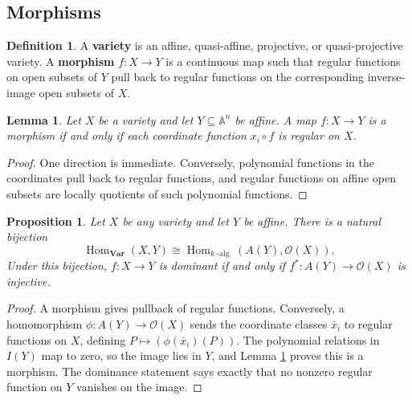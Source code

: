\documentclass[12pt]{article}
\theoremstyle{plain}
\newtheorem{proposition}[thm]{Proposition}
\newtheorem{lemma}[thm]{Lemma}
\theoremstyle{definition}
\newtheorem{defn}[thm]{Definition} %
\newcommand{\bb}[1]{\mathbb{#1}}
\DeclareMathOperator{\Hom}{Hom}
\begin{document}
\subsection{Morphisms}
\begin{defn}
A \textbf{variety} is an affine, quasi-affine, projective, or quasi-projective variety. A \textbf{morphism} $f:X\to Y$ is a continuous map such that regular functions on open subsets of $Y$ pull back to regular functions on the corresponding inverse-image open subsets of $X$.
\end{defn}
\begin{lemma}\label{lem:check_variables}
Let $X$ be a variety and let $Y\subseteq\bb A^n$ be affine. A map $f:X\to Y$ is a morphism if and only if each coordinate function $x_i\circ f$ is regular on $X$.
\end{lemma}
\begin{proof}
One direction is immediate. Conversely, polynomial functions in the coordinates pull back to regular functions, and regular functions on affine open subsets are locally quotients of such polynomial functions.
\end{proof}
\begin{proposition}\label{prop:adjunction}
Let $X$ be any variety and let $Y$ be affine. There is a natural bijection
\[
\Hom_{\mathbf{Var}}(X,Y)\cong\Hom_{k\operatorname{-alg}}(A(Y),\mathcal O(X)).
\]
Under this bijection, $f:X\to Y$ is dominant if and only if $f^*:A(Y)\to\mathcal O(X)$ is injective.
\end{proposition}
\begin{proof}
A morphism gives pullback of regular functions. Conversely, a homomorphism $\phi:A(Y)\to\mathcal O(X)$ sends the coordinate classes $\bar x_i$ to regular functions on $X$, defining $P\mapsto(\phi(\bar x_i)(P))$. The polynomial relations in $I(Y)$ map to zero, so the image lies in $Y$, and Lemma \ref{lem:check_variables} proves this is a morphism. The dominance statement says exactly that no nonzero regular function on $Y$ vanishes on the image.
\end{proof}
\end{document}
